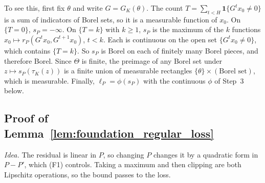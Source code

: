 To see this, first fix $\theta$ and write $G=G_K(\theta)$. The count
$T=\sum_{t<H}\mathbf 1\{G^tx_0\ne0\}$ is a sum of indicators of Borel sets,
so it is a measurable function of $x_0$. On $\{T=0\}$, $s_P=-\infty$. On
$\{T=k\}$ with $k\ge1$, $s_P$ is the maximum of the $k$ functions
$x_0\mapsto r_P(G^tx_0,G^{t+1}x_0)$, $t<k$. Each is continuous on the open
set $\{G^tx_0\ne0\}$, which contains $\{T=k\}$. So $s_P$ is Borel on each
of finitely many Borel pieces, and therefore Borel. Since $\Theta$ is
finite, the preimage of any Borel set under $z\mapsto s_P(\tau_K(z))$ is a
finite union of measurable rectangles $\{\theta\}\times(\text{Borel set})$,
which is measurable. Finally, $\ell_P=\phi(s_P)$ with the continuous $\phi$
of Step~3 below.

\subsection{Proof of Lemma~\ref{lem:foundation_regular_loss}}
\label{subsec:proof_regular_loss}

\emph{Idea.} The residual is linear in $P$, so changing $P$ changes it by a
quadratic form in $P-P'$, which (F1) controls. Taking a maximum and then
clipping are both Lipschitz operations, so the bound passes to the loss.

